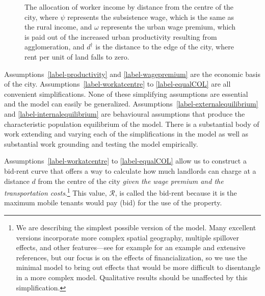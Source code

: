 \begin{figure}[!ht]
    \begin{center}
    
    \caption[The allocation of worker income by distance from the centre of the city]{The allocation of worker income by distance from the centre of the city, where $\psi$ represents the \gls{subsistence wage}, which is the same as the rural income, and $\omega$ represents the \gls{urban wage premium}, which is paid out of the increased urban productivity resulting from agglomeration, and $d^\dagger$ is the distance to the edge of the city, where rent per unit of land falls to zero.}
    \label{fig-alonso-simple}
    \end{center}
\end{figure}

Assumptions~\ref{label-productivity} and \ref{label-wagepremium} are the economic basis of the city. Assumptions~\ref{label-workatcentre}  to \ref{label-equalCOL} are all convenient simplifications. None of these simplifying assumptions are essential and the model can easily be generalized. %
Assumptions~\ref{label-externalequilibrium} and \ref{label-internalequilibrium} are behavioural assumptions that produce the characteristic population \gls{equilibrium} of the model. There is a substantial body of work extending and varying each of the simplifications in the model as well as substantial work grounding and testing the model empirically.


Assumptions~\ref{label-workatcentre}  to \ref{label-equalCOL} allow us to construct a \gls{bid-rent curve} that offers a way to calculate how much landlords can charge at a distance $d$ from the centre of the city \emph{given the wage premium and the transportation costs}.\footnote{We are describing the simplest possible version of the model. Many excellent versions incorporate more complex spatial geography, multiple spillover effects, and other features---see for example \cite{ahlfeldtEconomicsDensityEvidence2015} for an example and extensive references, but our focus is on the effects of financialization, so we use the minimal model to bring out effects that would be more difficult to disentangle in a more complex model. Qualitative results should be unaffected by this simplification.}  This value, $\mathcal{R}$, is called the bid-rent because it is the maximum mobile tenants would pay (bid) for the use of the property.

